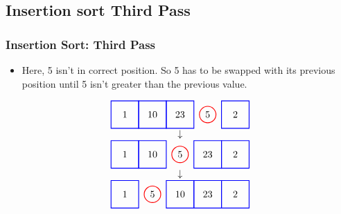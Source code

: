\documentclass{beamer}
\begin{document}
\subsection{Insertion sort Third Pass}
\begin{frame}[c, fragile]
\frametitle{Insertion Sort: Third Pass}

\begin{itemize}
    \item Here, 5 isn't in correct position. So 5 has to be swapped with its previous position until 5 isn't greater than the previous value.
\end{itemize}

\[
\begin{array}{c}
\begin{tikzpicture}[baseline=(current bounding box.center)]
    \node at (0,0) {1};
    \node at (1,0) {10};
    \node at (2,0) {23};
    \node at (3,0) {5};
    \node at (4,0) {2};
    \draw[red, thick] (3,0) circle (0.3);
    \draw[blue, thick] (-0.5,-0.5) rectangle (0.5,0.5);
    \draw[blue, thick] (0.5,-0.5) rectangle (1.5,0.5);
    \draw[blue, thick] (1.5,-0.5) rectangle (2.5,0.5);
    \draw[blue, thick] (3.5,-0.5) rectangle (4.5,0.5);
\end{tikzpicture} \\
\downarrow \\
\begin{tikzpicture}[baseline=(current bounding box.center)]
    \node at (0,0) {1};
    \node at (1,0) {10};
    \node at (2,0) {5};
    \node at (3,0) {23};
    \node at (4,0) {2};
    \draw[red, thick] (2,0) circle (0.3);
    \draw[blue, thick] (-0.5,-0.5) rectangle (0.5,0.5);
    \draw[blue, thick] (0.5,-0.5) rectangle (1.5,0.5);
    \draw[blue, thick] (2.5,-0.5) rectangle (3.5,0.5);
    \draw[blue, thick] (3.5,-0.5) rectangle (4.5,0.5);
\end{tikzpicture} \\
\downarrow \\
\begin{tikzpicture}[baseline=(current bounding box.center)]
    \node at (0,0) {1};
    \node at (1,0) {5};
    \node at (2,0) {10};
    \node at (3,0) {23};
    \node at (4,0) {2};
    \draw[red, thick] (1,0) circle (0.3);
    \draw[blue, thick] (-0.5,-0.5) rectangle (0.5,0.5);
    \draw[blue, thick] (1.5,-0.5) rectangle (2.5,0.5);
    \draw[blue, thick] (2.5,-0.5) rectangle (3.5,0.5);
    \draw[blue, thick] (3.5,-0.5) rectangle (4.5,0.5);
\end{tikzpicture}
\end{array}
\]
\end{frame}
\end{document}
